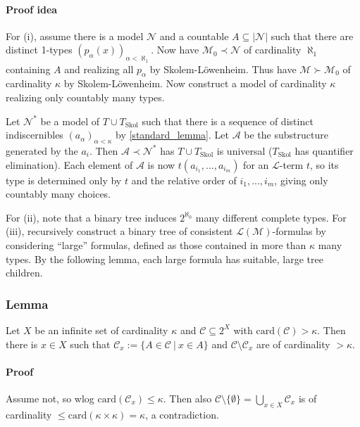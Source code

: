 \documentclass{scrartcl}
\begin{document}
\paragraph{Proof idea}
For (i), assume there is a model $\mathcal{N}$ and a countable $A \subseteq |\mathcal{N}|$ such that there are distinct 1-types $(p_\alpha(x))_{\alpha < \aleph_1}$.
Now have $\mathcal{M}_0 \prec \mathcal{N}$ of cardinality $\aleph_1$ containing $A$ and realizing all $p_\alpha$ by Skolem-Löwenheim.
Thus have $\mathcal{M} \succ \mathcal{M}_0$ of cardinality $\kappa$ by Skolem-Löwenheim.
Now construct a model of cardinality $\kappa$ realizing only countably many types.

Let $\mathcal{N}^*$ be a model of $T \cup T_{\mathrm{Skol}}$ such that there is a sequence of distinct indiscernibles $(a_\alpha)_{\alpha < \kappa}$ by \ref{standard_lemma}.
Let $\mathcal{A}$ be the substructure generated by the $a_i$. Then $\mathcal{A} \prec \mathcal{N}^*$ has $T \cup T_{\mathrm{Skol}}$ is universal ($T_{\mathrm{Skol}}$ has quantifier elimination).
Each element of $\mathcal{A}$ is now $t(a_{i_1}, ..., a_{i_m})$ for an $\mathcal{L}$-term $t$, so its type is determined only by $t$ and the relative order of $i_1, ..., i_m$, giving only countably many choices.

For (ii), note that a binary tree induces $2^{\aleph_0}$ many different complete types.
For (iii), recursively construct a binary tree of consistent $\mathcal{L}(\mathcal{M})$-formulas by considering ``large'' formulas, defined as those contained in more than $\kappa$ many types.
By the following lemma, each large formula has suitable, large tree children.

\subsubsection{Lemma}
Let $X$ be an infinite set of cardinality $\kappa$ and $\mathcal{C} \subseteq 2^X$ with $\mathrm{card}(\mathcal{C}) > \kappa$.
Then there is $x \in X$ such that $\mathcal{C}_x := \{ A \in \mathcal{C} \ | \ x \in A \}$ and $\mathcal{C} \setminus \mathcal{C}_x$ are of cardinality $> \kappa$.
\paragraph{Proof} Assume not, so wlog $\mathrm{card}(\mathcal{C}_x) \leq \kappa$. Then also $\mathcal{C} \setminus \{ \emptyset \} = \bigcup_{x \in X} \mathcal{C}_x$ is of cardinality $\leq \mathrm{card}(\kappa \times \kappa) = \kappa$, a contradiction.
\end{document}
